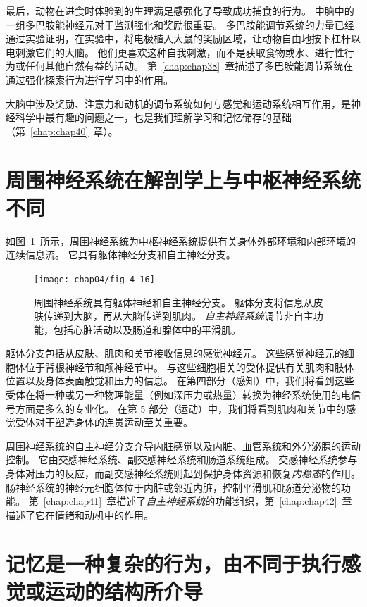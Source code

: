 最后，动物在进食时体验到的生理满足感强化了导致成功捕食的行为。
中脑中的一组多巴胺能神经元对于监测强化和奖励很重要。 
多巴胺能调节系统的力量已经通过实验证明，在实验中，将电极植入大鼠的奖励区域，让动物自由地按下杠杆以电刺激它们的大脑。 
他们更喜欢这种自我刺激，而不是获取食物或水、进行性行为或任何其他自然有益的活动。 
第~\ref{chap:chap38}~章描述了多巴胺能调节系统在通过强化探索行为进行学习中的作用。


大脑中涉及奖励、注意力和动机的调节系统如何与感觉和运动系统相互作用，是神经科学中最有趣的问题之一，也是我们理解学习和记忆储存的基础（第~\ref{chap:chap40}~章）。



\section{周围神经系统在解剖学上与中枢神经系统不同}

如图~\ref{fig:4_16}~所示，周围神经系统为中枢神经系统提供有关身体外部环境和内部环境的连续信息流。
它具有躯体神经分支和自主神经分支。


\begin{figure}[htbp]
	\centering
	\texttt{[image: chap04/fig\_4\_16]}
	\caption{周围神经系统具有躯体神经和自主神经分支。
		躯体分支将信息从皮肤传递到大脑，再从大脑传递到肌肉。
		\textit{自主神经系统}调节非自主功能，包括心脏活动以及肠道和腺体中的平滑肌。}
	\label{fig:4_16}
\end{figure}


躯体分支包括从皮肤、肌肉和关节接收信息的感觉神经元。
这些感觉神经元的细胞体位于背根神经节和颅神经节中。 
与这些细胞相关的受体提供有关肌肉和肢体位置以及身体表面触觉和压力的信息。
在第四部分（感知）中，我们将看到这些受体在将一种或另一种物理能量（例如深压力或热量）转换为神经系统使用的电信号方面是多么的专业化。
在第 5 部分（运动）中，我们将看到肌肉和关节中的感觉受体对于塑造身体的连贯运动至关重要。


周围神经系统的自主神经分支介导内脏感觉以及内脏、血管系统和外分泌腺的运动控制。
它由交感神经系统、副交感神经系统和肠道系统组成。 
交感神经系统参与身体对压力的反应，而副交感神经系统则起到保护身体资源和恢复\textit{内稳态}的作用。
肠神经系统的神经元细胞体位于内脏或邻近内脏，控制平滑肌和肠道分泌物的功能。
第~\ref{chap:chap41}~章描述了\textit{自主神经系统}的功能组织，第~\ref{chap:chap42}~章描述了它在情绪和动机中的作用。



\section{记忆是一种复杂的行为，由不同于执行感觉或运动的结构所介导}


